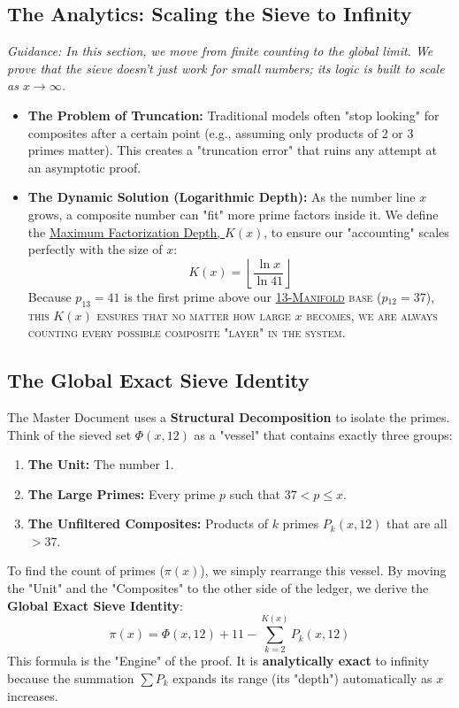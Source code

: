 \documentclass[sn-mathphys-num, pdflatex]{sn-jnl}
\newcommand{\gterm}[2]{\begingroup\normalfont\scshape\hyperlink{#1}{#2}\endgroup}
\newcommand{\glink}[2]{\hyperref[gloss:#1]{#2}}
\begin{document}
\subsection{The Analytics: Scaling the Sieve to Infinity}
\textit{Guidance: In this section, we move from finite counting to the global limit. We prove that the sieve doesn't just work for small numbers; its logic is built to scale as $x \to \infty$.}

\begin{itemize}
    \item \textbf{The Problem of Truncation:} Traditional models often "stop looking" for composites after a certain point (e.g., assuming only products of 2 or 3 primes matter). This creates a "truncation error" that ruins any attempt at an asymptotic proof.
    \item \textbf{The Dynamic Solution (Logarithmic Depth):} As the number line $x$ grows, a composite number can "fit" more prime factors inside it. We define the \glink{k-limit}{Maximum Factorization Depth, $K(x)$}, to ensure our "accounting" scales perfectly with the size of $x$:
    \begin{equation}
        K(x) = \left\lfloor \frac{\ln x}{\ln 41} \right\rfloor
    \end{equation}
    Because $p_{13}=41$ is the first prime above our \gterm{m13}{13-Manifold} base ($p_{12}=37$), this $K(x)$ ensures that no matter how large $x$ becomes, we are always counting every possible composite "layer" in the system.
\end{itemize}

\subsection{The Global Exact Sieve Identity}
The Master Document uses a \textbf{Structural Decomposition} to isolate the primes. Think of the sieved set $\Phi(x,12)$ as a "vessel" that contains exactly three groups:
\begin{enumerate}
    \item \textbf{The Unit:} The number 1.
    \item \textbf{The Large Primes:} Every prime $p$ such that $37 < p \le x$.
    \item \textbf{The Unfiltered Composites:} Products of $k$ primes $P_k(x,12)$ that are all $>37$.
\end{enumerate}

To find the count of primes ($\pi(x)$), we simply rearrange this vessel. By moving the "Unit" and the "Composites" to the other side of the ledger, we derive the \textbf{Global Exact Sieve Identity}:
\begin{equation}
\label{eq:global_sieve}
\pi(x) = \Phi(x,12) + 11 - \sum_{k=2}^{K(x)} P_k(x,12)
\end{equation}
This formula is the "Engine" of the proof. It is \textbf{analytically exact} to infinity because the summation \glink{pk-engine}{$\sum P_k$} expands its range (its "depth") automatically as $x$ increases.
\end{document}
